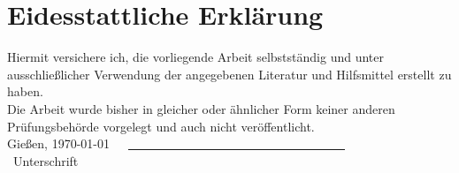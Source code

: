 \chapter{Eidesstattliche Erklärung}
\begin{center}
\end{center}
\normalsize
Hiermit versichere ich, die vorliegende Arbeit selbstständig und unter
ausschließlicher Verwendung der angegebenen Literatur und Hilfsmittel erstellt
zu haben.
\vspace*{2em}
\\
Die Arbeit wurde bisher in gleicher oder ähnlicher Form keiner anderen
Prüfungsbehörde vorgelegt und auch nicht veröffentlicht.
\vspace{3em}
\\
Gießen, \today \ \ \ \underline{\ \ \ \ \ \ \ \ \ \ \ \ \ \ \ \ \ \ \ \ \ \ \ \
\ \ \ \ \ \ \ \ \ \ \ }
\\
\hspace*{13.5em}
\small{\ Unterschrift}